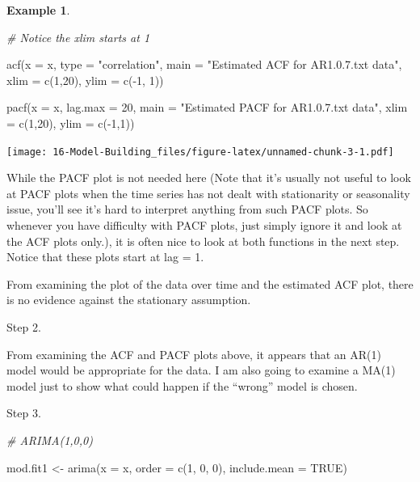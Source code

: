 \documentclass[
]{book}
\newenvironment{Shaded}{\begin{snugshade}}{\end{snugshade}}
\newcommand{\AttributeTok}[1]{\textcolor[rgb]{0.77,0.63,0.00}{#1}}
\newcommand{\CommentTok}[1]{\textcolor[rgb]{0.56,0.35,0.01}{\textit{#1}}}
\newcommand{\ConstantTok}[1]{\textcolor[rgb]{0.00,0.00,0.00}{#1}}
\newcommand{\DecValTok}[1]{\textcolor[rgb]{0.00,0.00,0.81}{#1}}
\newcommand{\FunctionTok}[1]{\textcolor[rgb]{0.00,0.00,0.00}{#1}}
\newcommand{\NormalTok}[1]{#1}
\newcommand{\OtherTok}[1]{\textcolor[rgb]{0.56,0.35,0.01}{#1}}
\newcommand{\SpecialCharTok}[1]{\textcolor[rgb]{0.00,0.00,0.00}{#1}}
\newcommand{\StringTok}[1]{\textcolor[rgb]{0.31,0.60,0.02}{#1}}
\theoremstyle{definition}
\theoremstyle{definition}
\newtheorem{example}{Example}[chapter]
\theoremstyle{definition}
\theoremstyle{definition}
\theoremstyle{remark}
\begin{document}
\begin{example}
\begin{Shaded}
\begin{Highlighting}[]
\CommentTok{\# Notice the xlim starts at 1}

\FunctionTok{acf}\NormalTok{(}\AttributeTok{x =}\NormalTok{ x, }\AttributeTok{type =} \StringTok{"correlation"}\NormalTok{, }\AttributeTok{main =} \StringTok{"Estimated ACF }
\StringTok{    for AR1.0.7.txt data"}\NormalTok{, }\AttributeTok{xlim =} \FunctionTok{c}\NormalTok{(}\DecValTok{1}\NormalTok{,}\DecValTok{20}\NormalTok{), }\AttributeTok{ylim =} \FunctionTok{c}\NormalTok{(}\SpecialCharTok{{-}}\DecValTok{1}\NormalTok{, }\DecValTok{1}\NormalTok{))}


\FunctionTok{pacf}\NormalTok{(}\AttributeTok{x =}\NormalTok{ x, }\AttributeTok{lag.max =} \DecValTok{20}\NormalTok{, }\AttributeTok{main =} \StringTok{"Estimated PACF for }
\StringTok{         AR1.0.7.txt data"}\NormalTok{, }\AttributeTok{xlim =} \FunctionTok{c}\NormalTok{(}\DecValTok{1}\NormalTok{,}\DecValTok{20}\NormalTok{), }\AttributeTok{ylim =} \FunctionTok{c}\NormalTok{(}\SpecialCharTok{{-}}\DecValTok{1}\NormalTok{,}\DecValTok{1}\NormalTok{))}
\end{Highlighting}
\end{Shaded}

\texttt{[image: 16-Model-Building\_files/figure-latex/unnamed-chunk-3-1.pdf]}

While the PACF plot is not needed here (Note that it's usually not useful to look at PACF plots when the time series has not dealt with stationarity or seasonality issue, you'll see it's hard to interpret anything from such PACF plots. So whenever you have difficulty with PACF plots, just simply ignore it and look at the ACF plots only.), it is often nice to look at both functions in the next step. Notice that these plots start at lag = 1.

From examining the plot of the data over time and the estimated ACF plot, there is no evidence against the stationary assumption.

Step 2.

From examining the ACF and PACF plots above, it appears that an AR(1) model would be appropriate for the data. I am also going to examine a MA(1) model just to show what could happen if the ``wrong'' model is chosen.

Step 3.

\begin{Shaded}
\begin{Highlighting}[]
\CommentTok{\# ARIMA(1,0,0)}

\NormalTok{mod.fit1 }\OtherTok{\textless{}{-}} \FunctionTok{arima}\NormalTok{(}\AttributeTok{x =}\NormalTok{ x, }\AttributeTok{order =} \FunctionTok{c}\NormalTok{(}\DecValTok{1}\NormalTok{, }\DecValTok{0}\NormalTok{, }\DecValTok{0}\NormalTok{), include.mean }
    \OtherTok{=} \ConstantTok{TRUE}\NormalTok{)}


\end{Highlighting}
\end{Shaded}
\end{example}
\end{document}

